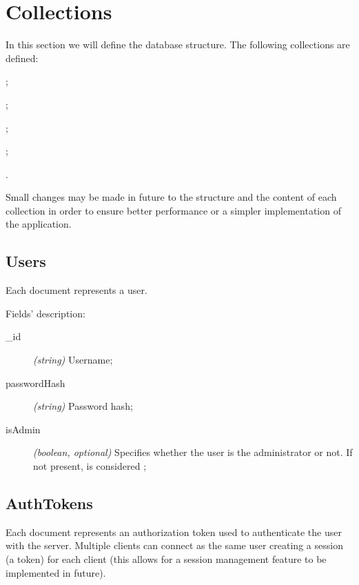 \section{Collections}\label{sec:collections}

In this section we will define the database structure. The following collections
are defined:
\begin{enumerate*}[label=]
	\item {};
	\item {};
	\item {};
	\item {};
	\item {}.
\end{enumerate*}

Small changes may be made in future to the structure and the content of each
collection in order to ensure better performance or a simpler implementation of
the application.

\subsection{Users}

Each document represents a user.



Fields' description:
\begin{description}
	\item[\_id] \textit{(string)} Username;
	\item[passwordHash] \textit{(string)} Password hash;
	\item[isAdmin] \textit{(boolean, optional)} Specifies whether the user
		is the administrator or not. If not present, is considered
		;
\end{description}

\subsection{AuthTokens}

Each document represents an authorization token used to authenticate the user
with the server. Multiple clients can connect as the same user creating a
session (a token) for each client (this allows for a session management feature
to be implemented in future).



